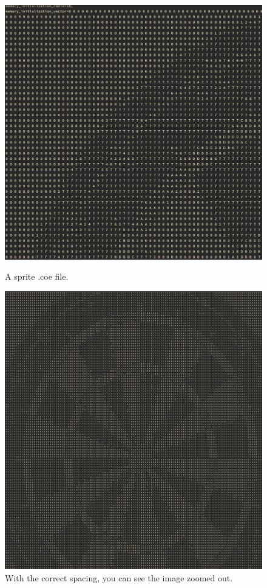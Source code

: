 \documentclass{ifda}
\begin{document}
\begin{figure}[h!]
    \centering
    \begin{minipage}{0.48\textwidth}
        \centering
        \includegraphics[width=1\textwidth]{ corner }
        \caption{A sprite .coe file.}
        \label{fig:sync_count}
    \end{minipage}\hfill
    \begin{minipage}{0.38\textwidth}
        \centering
        \includegraphics[width=1\textwidth]{ target }
        \caption{With the correct spacing, you can see the image zoomed out.}
        \label{fig:code1}
    \end{minipage}
\end{figure}
\end{document}
